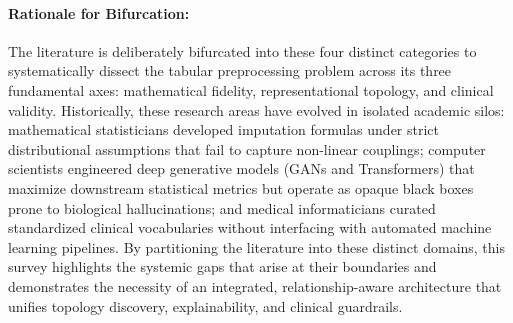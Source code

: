 \documentclass[MTech]{ugthesis}
\begin{document}
\paragraph{Rationale for Bifurcation:} 
The literature is deliberately bifurcated into these four distinct categories to systematically dissect the tabular preprocessing problem across its three fundamental axes: mathematical fidelity, representational topology, and clinical validity. Historically, these research areas have evolved in isolated academic silos: mathematical statisticians developed imputation formulas under strict distributional assumptions that fail to capture non-linear couplings; computer scientists engineered deep generative models (GANs and Transformers) that maximize downstream statistical metrics but operate as opaque black boxes prone to biological hallucinations; and medical informaticians curated standardized clinical vocabularies without interfacing with automated machine learning pipelines. By partitioning the literature into these distinct domains, this survey highlights the systemic gaps that arise at their boundaries and demonstrates the necessity of an integrated, relationship-aware architecture that unifies topology discovery, explainability, and clinical guardrails.
\end{document}
